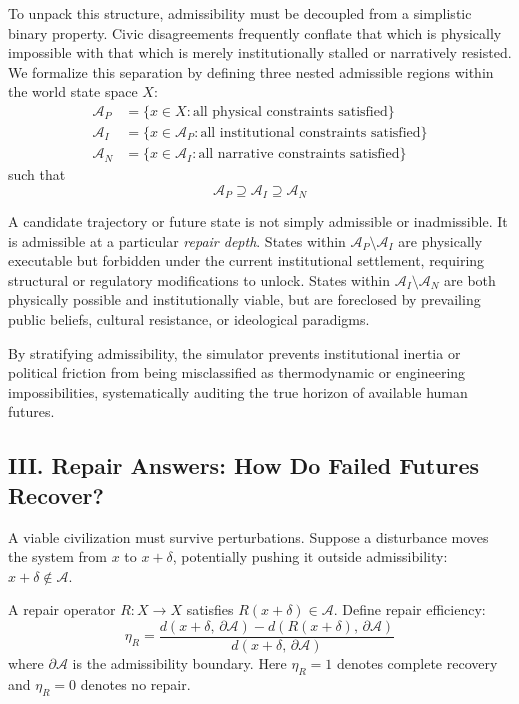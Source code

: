 \documentclass[12pt]{article}
\begin{document}
To unpack this structure, admissibility must be decoupled from a simplistic binary property. Civic disagreements frequently conflate that which is physically impossible with that which is merely institutionally stalled or narratively resisted. We formalize this separation by defining three nested admissible regions within the world state space $X$:
\begin{align*}
  \mathcal{A}_P &= \{x \in X : \text{all physical constraints satisfied}\} \\
  \mathcal{A}_I &= \{x \in \mathcal{A}_P : \text{all institutional constraints satisfied}\} \\
  \mathcal{A}_N &= \{x \in \mathcal{A}_I : \text{all narrative constraints satisfied}\}
\end{align*}
such that
\begin{equation}
  \mathcal{A}_P \supseteq \mathcal{A}_I \supseteq \mathcal{A}_N
\end{equation}

A candidate trajectory or future state is not simply admissible or inadmissible. It is admissible at a particular \emph{repair depth}. States within $\mathcal{A}_P \setminus \mathcal{A}_I$ are physically executable but forbidden under the current institutional settlement, requiring structural or regulatory modifications to unlock. States within $\mathcal{A}_I \setminus \mathcal{A}_N$ are both physically possible and institutionally viable, but are foreclosed by prevailing public beliefs, cultural resistance, or ideological paradigms.

By stratifying admissibility, the simulator prevents institutional inertia or political friction from being misclassified as thermodynamic or engineering impossibilities, systematically auditing the true horizon of available human futures.

\subsection{III. Repair Answers: How Do Failed Futures Recover?}

A viable civilization must survive perturbations. Suppose a disturbance moves the system from $x$ to $x + \delta$, potentially pushing it outside admissibility: $x + \delta \notin \mathcal{A}$.

A repair operator $R: X \to X$ satisfies $R(x + \delta) \in \mathcal{A}$. Define repair efficiency:
\begin{equation}
  \eta_R = \frac{d(x+\delta,\, \partial\mathcal{A}) - d(R(x+\delta),\, \partial\mathcal{A})}{d(x+\delta,\, \partial\mathcal{A})}
\end{equation}
where $\partial\mathcal{A}$ is the admissibility boundary. Here $\eta_R = 1$ denotes complete recovery and $\eta_R = 0$ denotes no repair.
\end{document}
